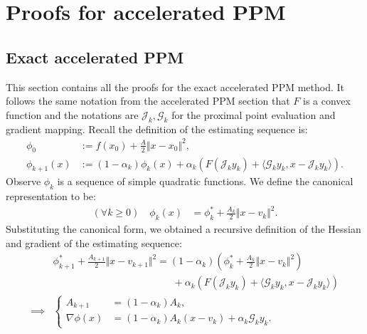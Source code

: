 \documentclass[12pt]{article}
\begin{document}
    
\section{Proofs for accelerated PPM}
    \subsection{Exact accelerated PPM}\label{sec:app:exct-acc-ppm}
        This section contains all the proofs for the exact accelerated PPM method. 
        It follows the same notation from the accelerated PPM section that $F$ is a convex function and the notations are $\mathcal J_k, \mathcal G_k$ for the proximal point evaluation and gradient mapping. 
        Recall the definition of the estimating sequence is: 
        \begin{align*}
            \phi_0 &:= f(x_0) + \frac{A}{2}\Vert x - x_0\Vert^2, 
            \\
            \phi_{k + 1}(x) &:= 
            (1 - \alpha_k)\phi_k(x)
            + 
            \alpha_k(F(\mathcal J_k y_k) + \langle \mathcal G_k y_k, x - \mathcal J_k y_k\rangle). 
        \end{align*}
        Observe $\phi_k$ is a sequence of simple quadratic functions. 
        We define the canonical representation to be: 
        \begin{align*}
            (\forall k \ge 0) \quad 
            \phi_k(x) &= \phi_k^* + \frac{A_k}{2} \Vert x - v_k\Vert^2. 
        \end{align*}
        Substituting the canonical form, we obtained a recursive definition of the Hessian and gradient of the estimating sequence: 
        \begin{align*}
            &
            \phi_{k+ 1}^* + \frac{A_{k + 1}}{2}\Vert x - v_{k + 1}\Vert^2
            = 
            (1 - \alpha_k)
            \left(\phi_k^* + \frac{A_k}{2}\Vert x - v_k\Vert^2\right)
            \\ & \hspace{12em}
                + 
                \alpha_k(F(\mathcal J_k y_k) + \langle \mathcal G_k y_k, x - \mathcal J_k y_k\rangle)
            \\
            \implies 
            &
            \left\lbrace
            \begin{aligned}
                A_{k + 1} 
                &= (1 - \alpha_k)A_k, 
                \\
                \nabla \phi(x)
                &= 
                (1 - \alpha_k)A_k(x - v_k) + \alpha_k \mathcal G_ky_k. 
            \end{aligned}
            \right.
        \end{align*}
\end{document}
